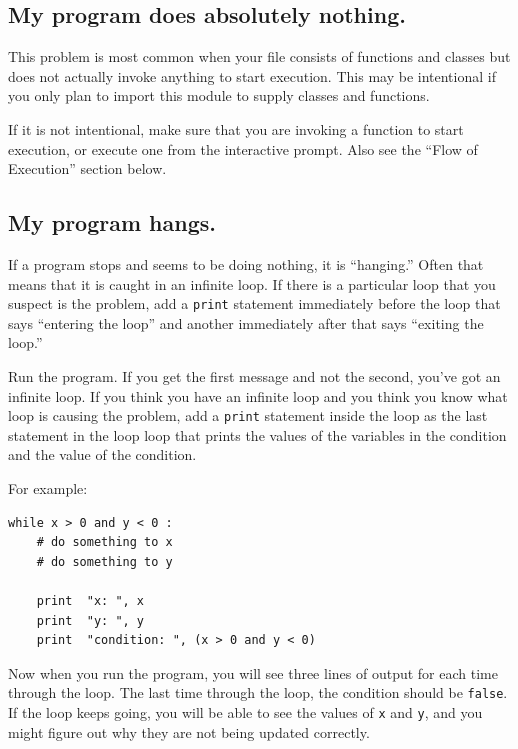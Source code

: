 \documentclass[10pt]{book}
\begin{document}
\subsection{My program does absolutely nothing.}

This problem is most common when your file consists of functions and
classes but does not actually invoke anything to start execution.
This may be intentional if you only plan to import this module to
supply classes and functions.

If it is not intentional, make sure that you
are invoking a function to start execution, or execute one from
the interactive prompt.  Also see the ``Flow of Execution'' section
below.


\subsection{My program hangs.}

If a program stops and seems to be doing nothing, it is ``hanging.''
Often that means that it is caught in an infinite loop.  
If there is a particular loop that you suspect is the
problem, add a {\tt print} statement immediately before the loop that says
``entering the loop'' and another immediately after that says
``exiting the loop.''


Run the program.  If you get the first message and not the second,
you've got an infinite loop.  
If you think you have an infinite loop and you think you know
what loop is causing the problem, add a {\tt print} statement 
inside the loop as the last statement in the loop
loop that prints the values of the variables in
the condition and the value of the condition.

For example:

\beforeverb
\begin{verbatim}
while x > 0 and y < 0 :
    # do something to x
    # do something to y

    print  "x: ", x
    print  "y: ", y
    print  "condition: ", (x > 0 and y < 0)
\end{verbatim}
\afterverb
%
Now when you run the program, you will see three lines of output
for each time through the loop.  The last time through the
loop, the condition should be {\tt false}.  If the loop keeps
going, you will be able to see the values of {\tt x} and {\tt y},
and you might figure out why they are not being updated correctly.
\end{document}

